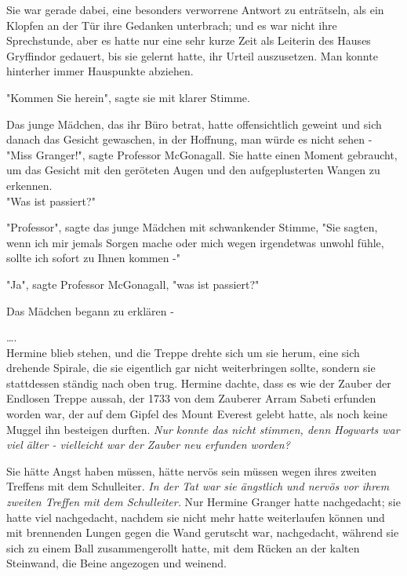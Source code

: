 {Sie war gerade dabei, eine besonders verworrene Antwort zu enträtseln, als ein Klopfen an der Tür ihre Gedanken unterbrach; und es war nicht ihre Sprechstunde, aber es hatte nur eine sehr kurze Zeit als Leiterin des Hauses Gryffindor gedauert, bis sie gelernt hatte, ihr Urteil auszusetzen. Man konnte hinterher immer Hauspunkte abziehen.

"Kommen Sie herein", sagte sie mit klarer Stimme.

Das junge Mädchen, das ihr Büro betrat, hatte offensichtlich geweint und sich danach das Gesicht gewaschen, in der Hoffnung, man würde es nicht sehen -\\ "Miss Granger!", sagte Professor McGonagall. Sie hatte einen Moment gebraucht, um das Gesicht mit den geröteten Augen und den aufgeplusterten Wangen zu erkennen.\\ "Was ist passiert?"

"Professor", sagte das junge Mädchen mit schwankender Stimme, "Sie sagten, wenn ich mir jemals Sorgen mache oder mich wegen irgendetwas unwohl fühle, sollte ich sofort zu Ihnen kommen -"

"Ja", sagte Professor McGonagall, "was ist passiert?"

Das Mädchen begann zu erklären -

….\\ Hermine blieb stehen, und die Treppe drehte sich um sie herum, eine sich drehende Spirale, die sie eigentlich gar nicht weiterbringen sollte, sondern sie stattdessen ständig nach oben trug. Hermine dachte, dass es wie der Zauber der Endlosen Treppe aussah, der 1733 von dem Zauberer Arram Sabeti erfunden worden war, der auf dem Gipfel des Mount Everest gelebt hatte, als noch keine Muggel ihn besteigen durften. \emph{Nur konnte das nicht stimmen, denn Hogwarts war viel älter - vielleicht war der Zauber neu erfunden worden?}

Sie hätte Angst haben müssen, hätte nervös sein müssen wegen ihres zweiten Treffens mit dem Schulleiter. \emph{In der Tat war sie ängstlich und nervös vor ihrem zweiten Treffen mit dem Schulleiter.} Nur Hermine Granger hatte nachgedacht; sie hatte viel nachgedacht, nachdem sie nicht mehr hatte weiterlaufen können und mit brennenden Lungen gegen die Wand gerutscht war, nachgedacht, während sie sich zu einem Ball zusammengerollt hatte, mit dem Rücken an der kalten Steinwand, die Beine angezogen und weinend.

}
